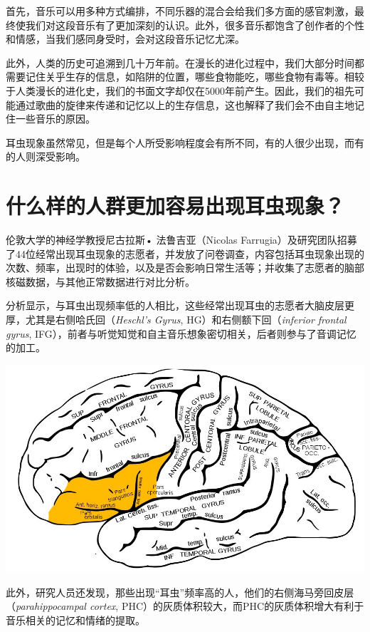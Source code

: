 \begin{multicols}{3}
首先，音乐可以用多种方式编排，不同乐器的混合会给我们多方面的感官刺激，最终使我们对这段音乐有了更加深刻的认识。此外，很多音乐都饱含了创作者的个性和情感，当我们感同身受时，会对这段音乐记忆尤深。

此外，人类的历史可追溯到几十万年前。在漫长的进化过程中，我们大部分时间都需要记住关乎生存的信息，如陷阱的位置，哪些食物能吃，哪些食物有毒等。相较于人类漫长的进化史，我们的书面文字却仅在5000年前产生。因此，我们的祖先可能通过歌曲的旋律来传递和记忆以上的生存信息，这也解释了我们会不由自主地记住一些音乐的原因。

耳虫现象虽然常见，但是每个人所受影响程度会有所不同，有的人很少出现，而有的人则深受影响。

\section*{什么样的人群更加容易出现耳虫现象？}

伦敦大学的神经学教授尼古拉斯• 法鲁吉亚（Nicolas Farrugia）及研究团队招募了44位经常出现耳虫现象的志愿者，并发放了问卷调查，内容包括耳虫现象出现的次数、频率，出现时的体验，以及是否会影响日常生活等；并收集了志愿者的脑部核磁数据，与其他正常数据进行对比分析。

分析显示，与耳虫出现频率低的人相比，这些经常出现耳虫的志愿者大脑皮层更厚，尤其是右侧哈氏回（\textit{Heschl's Gyrus}, HG）和右侧额下回（\textit{inferior frontal gyrus}, IFG），前者与听觉知觉和自主音乐想象密切相关，后者则参与了音调记忆的加工。

\noindent\includegraphics[width=\linewidth]{IMG/202001/image002.jpg}

此外，研究人员还发现，那些出现“耳虫”频率高的人，他们的右侧海马旁回皮层（\textit{parahippocampal cortex}, PHC）的灰质体积较大，而PHC的灰质体积增大有利于音乐相关的记忆和情绪的提取。



\end{multicols}
